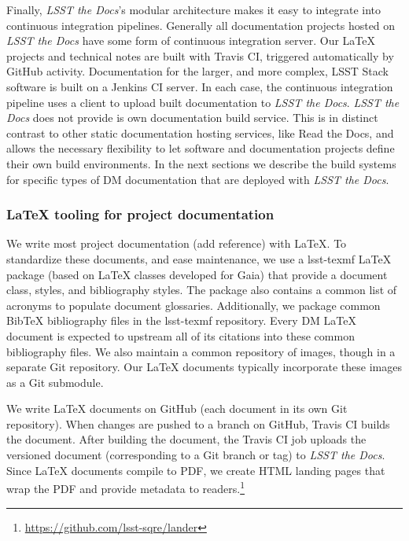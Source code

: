 Finally, \textit{LSST the Docs}'s modular architecture makes it easy to integrate into continuous integration pipelines.
Generally all documentation projects hosted on \textit{LSST the Docs} have some form of continuous integration server.
Our LaTeX projects and technical notes are built with Travis CI, triggered automatically by GitHub activity.
Documentation for the larger, and more complex, LSST Stack software is built on a Jenkins CI server.
In each case, the continuous integration pipeline uses a client to upload built documentation to \textit{LSST the Docs}.
\textit{LSST the Docs} does not provide is own documentation build service.
This is in distinct contrast to other static documentation hosting services, like Read the Docs, and allows the necessary flexibility to let software and documentation projects define their own build environments.
In the next sections we describe the build systems for specific types of DM documentation that are deployed with \textit{LSST the Docs}.

\subsubsection{LaTeX tooling for project documentation}
\label{sec:latex_tooling}

We write most project documentation (add reference) with LaTeX.
To standardize these documents, and ease maintenance, we use a lsst-texmf\cite{lsst-texmf} LaTeX package (based on LaTeX classes developed for Gaia) that provide a document class, styles, and bibliography styles.
The package also contains a common list of acronyms to populate document glossaries.
Additionally, we package common BibTeX bibliography files in the lsst-texmf repository.
Every DM LaTeX document is expected to upstream all of its citations into these common bibliography files.
We also maintain a common repository of images, though in a separate Git repository.
Our LaTeX documents typically incorporate these images as a Git submodule.

We write LaTeX documents on GitHub (each document in its own Git repository).
When changes are pushed to a branch on GitHub, Travis CI builds the document.
After building the document, the Travis CI job uploads the versioned document (corresponding to a Git branch or tag) to \textit{LSST the Docs}.
Since LaTeX documents compile to PDF, we create HTML landing pages that wrap the PDF and provide metadata to readers.\footnote{\url{https://github.com/lsst-sqre/lander}}

